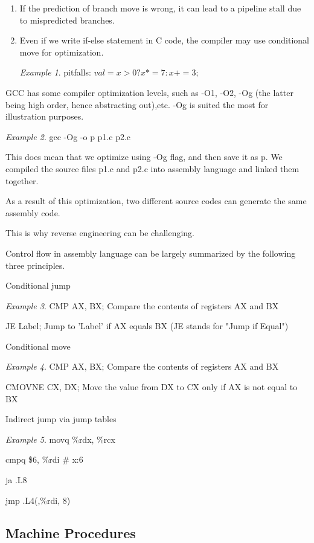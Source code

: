 \documentclass[11pt,reqno]{amsart}
\theoremstyle{remark}
\newtheorem{example}{Example}
\begin{document}
\begin{itemize}
\begin{enumerate}
\item If the prediction of branch move is wrong, it can lead to a pipeline stall due to mispredicted branches.
\item Even if we write if-else statement in C code, the compiler may use conditional move for optimization.
\begin{example}
pitfalls: $val = x>0 ? x*=7 : x+=3;$
\end{example}
\end{enumerate}
\item GCC has some compiler optimization levels, such as -O1, -O2, -Og (the latter being high order, hence abstracting out),etc.
 -Og is suited the most for illustration purposes. 
\begin{example}
\item gcc -Og -o p p1.c p2.c
\item This does mean that we optimize using -Og flag, and then save it as p. We compiled 
the source files p1.c and p2.c into assembly language and linked them together. 
\end{example}
\item As a result of this optimization, two different source codes can generate the same assembly code.
\item This is why reverse engineering can be challenging.
\item Control flow in assembly language can be largely summarized by the following three principles.
\begin{enumerate}
\item Conditional jump
\begin{example}
\item CMP AX, BX; Compare the contents of registers AX and BX
\item JE  Label; Jump to 'Label' if AX equals BX (JE stands for "Jump if Equal")
\end{example}
\item Conditional move
\begin{example}
\item CMP AX, BX; Compare the contents of registers AX and BX
\item CMOVNE CX, DX; Move the value from DX to CX only if AX is not equal to BX
\end{example}
\item Indirect jump via jump tables
\begin{example}
\item movq \%rdx, \%rcx
\item cmpq \$6, \%rdi \# x:6
\item ja      .L8
\item jmp \*.L4(,\%rdi, 8)
\end{example}
\end{enumerate}
\end{itemize}
\subsection*{Machine Procedures}
\end{document}
